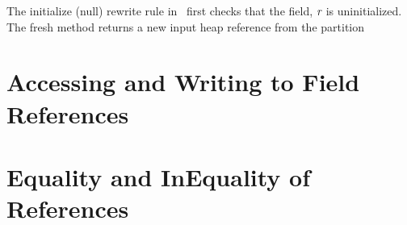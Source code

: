 The initialize (null) rewrite rule in~ first
checks that the field, $\emph{r}$ is uninitialized. The fresh method
returns a new input heap reference from the partition 


\section{Accessing and Writing to Field References}

\section{Equality and InEquality of References}





